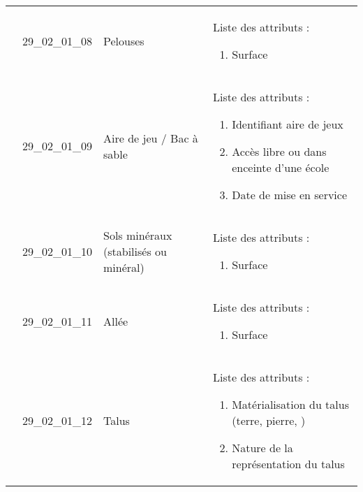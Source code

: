 \documentclass[12pt,titlepage]{book}
\begin{document}
\begin{supertabular}{|p{10cm}|c|p{13cm}|p{12cm}|}
                    & 29\_02\_01\_08 & Pelouses & Liste des attributs :
\begin{enumerate}
  \item Surface\end{enumerate}
\\


                    & 29\_02\_01\_09 & Aire de jeu / Bac à sable & Liste des attributs :
\begin{enumerate}
  \item Identifiant aire de jeux  \item Accès libre ou dans enceinte d'une école  \item Date de mise en service\end{enumerate}
\\


                    & 29\_02\_01\_10 & Sols minéraux (stabilisés ou minéral) & Liste des attributs :
\begin{enumerate}
  \item Surface\end{enumerate}
\\


                    & 29\_02\_01\_11 & Allée & Liste des attributs :
\begin{enumerate}
  \item Surface\end{enumerate}
\\


                    & 29\_02\_01\_12 & Talus & Liste des attributs :
\begin{enumerate}
  \item Matérialisation du talus (terre, pierre, )  \item Nature de la représentation du talus\end{enumerate}
\\
\hline
\end{supertabular}
\end{document}
